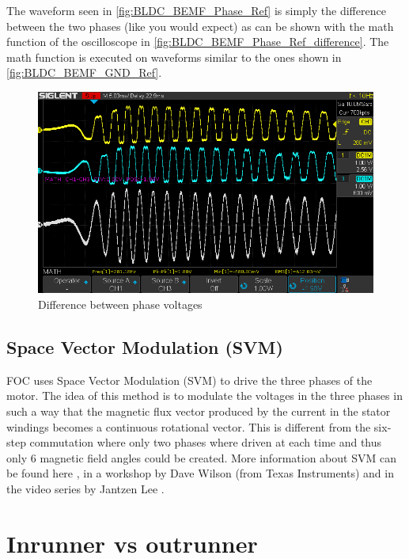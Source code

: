 \documentclass[]{report}
\begin{document}
The waveform seen in \autoref{fig:BLDC_BEMF_Phase_Ref} is simply the difference between the two phases (like you would expect) as can be shown with the math function of the oscilloscope in \autoref{fig:BLDC_BEMF_Phase_Ref_difference}. The math function is executed on waveforms similar to the ones shown in \autoref{fig:BLDC_BEMF_GND_Ref}.

\begin{figure}[H]
	\centering
	\includegraphics[width=\textwidth]{Scope/EmaxEco2306_threePhases/Freewheel/FreewheelThreePhasesGround_SubtractoinPhase1And3.png}
	\caption{Difference between phase voltages}
	\label{fig:BLDC_BEMF_Phase_Ref_difference}
\end{figure}

\subsection{Space Vector Modulation (SVM)}
FOC uses Space Vector Modulation (SVM) to drive the three phases of the motor. The idea of this method is to modulate the voltages in the three phases in such a way that the magnetic flux vector produced by the current in the stator windings becomes a continuous rotational vector. This is different from the six-step commutation where only two phases where driven at each time and thus only 6 magnetic field angles could be created. More information about SVM can be found here \cite{Infineon_sensorless_FOC}, in a workshop by Dave Wilson (from Texas Instruments) \cite{Teaching_Old_Motors_New_Tricks_--_Part_3} and in the video series by Jantzen Lee \cite{JantzenLeeUnderstandingMotors}.

\section{Inrunner vs outrunner} \label{section:InrunnerOutrunner}
\end{document}
